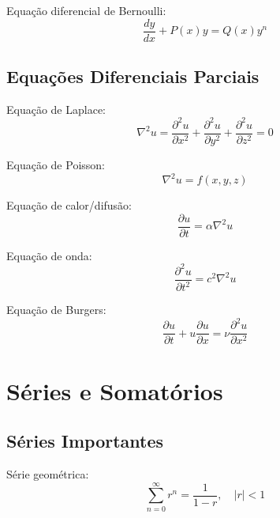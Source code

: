 Equação diferencial de Bernoulli:
\begin{equation}
\frac{dy}{dx} + P(x)y = Q(x)y^n
\end{equation}

\subsection{Equações Diferenciais Parciais}

Equação de Laplace:
\begin{equation}
\nabla^2 u = \frac{\partial^2 u}{\partial x^2} + \frac{\partial^2 u}{\partial y^2} + \frac{\partial^2 u}{\partial z^2} = 0
\end{equation}

Equação de Poisson:
\begin{equation}
\nabla^2 u = f(x,y,z)
\end{equation}

Equação de calor/difusão:
\begin{equation}
\frac{\partial u}{\partial t} = \alpha \nabla^2 u
\end{equation}

Equação de onda:
\begin{equation}
\frac{\partial^2 u}{\partial t^2} = c^2 \nabla^2 u
\end{equation}

Equação de Burgers:
\begin{equation}
\frac{\partial u}{\partial t} + u\frac{\partial u}{\partial x} = \nu\frac{\partial^2 u}{\partial x^2}
\end{equation}


\section{Séries e Somatórios}

\subsection{Séries Importantes}

Série geométrica:
\begin{equation}
\sum_{n=0}^{\infty} r^n = \frac{1}{1-r}, \quad |r| < 1
\end{equation}

